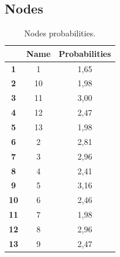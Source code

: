 \documentclass{article}
\begin{document}
\subsection{Nodes}
\begin{table}[!ht]
\centering
\begin{tabular}{c||c|c|}
\cline{2-3}
 & \cellcolor{gray90}\textbf{Name} & \cellcolor{gray90}\textbf{Probabilities}  \\
\hline\hline
\multicolumn{1}{|c||}{\cellcolor{gray90}\textbf{1}} & 1 & 1,65 \\ \hline
\multicolumn{1}{|c||}{\cellcolor{gray90}\textbf{2}} & 10 & 1,98 \\ \hline
\multicolumn{1}{|c||}{\cellcolor{gray90}\textbf{3}} & 11 & 3,00 \\ \hline
\multicolumn{1}{|c||}{\cellcolor{gray90}\textbf{4}} & 12 & 2,47 \\ \hline
\multicolumn{1}{|c||}{\cellcolor{gray90}\textbf{5}} & 13 & 1,98 \\ \hline
\multicolumn{1}{|c||}{\cellcolor{gray90}\textbf{6}} & 2 & 2,81 \\ \hline
\multicolumn{1}{|c||}{\cellcolor{gray90}\textbf{7}} & 3 & 2,96 \\ \hline
\multicolumn{1}{|c||}{\cellcolor{gray90}\textbf{8}} & 4 & 2,41 \\ \hline
\multicolumn{1}{|c||}{\cellcolor{gray90}\textbf{9}} & 5 & 3,16 \\ \hline
\multicolumn{1}{|c||}{\cellcolor{gray90}\textbf{10}} & 6 & 2,46 \\ \hline
\multicolumn{1}{|c||}{\cellcolor{gray90}\textbf{11}} & 7 & 1,98 \\ \hline
\multicolumn{1}{|c||}{\cellcolor{gray90}\textbf{12}} & 8 & 2,96 \\ \hline
\multicolumn{1}{|c||}{\cellcolor{gray90}\textbf{13}} & 9 & 2,47 \\ \hline
\end{tabular}
\caption{Nodes probabilities.}
\end{table}

\newpage
\newpage
\tableofcontents
\newpage
\end{document}

